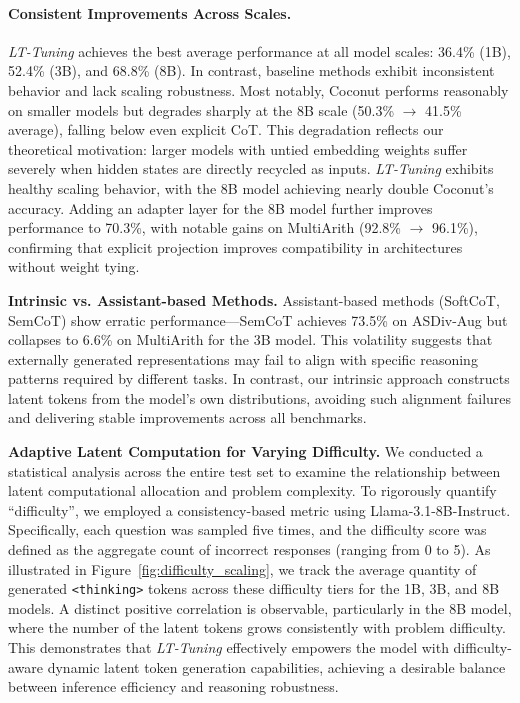 \documentclass{article}
\theoremstyle{plain}
\theoremstyle{definition}
\theoremstyle{remark}
\begin{document}
\paragraph{Consistent Improvements Across Scales.}
\textit{LT-Tuning} achieves the best average performance at all model scales: 36.4\% (1B), 52.4\% (3B), and 68.8\% (8B). In contrast, baseline methods exhibit inconsistent behavior and lack scaling robustness. Most notably, Coconut performs reasonably on smaller models but degrades sharply at the 8B scale (50.3\% $\rightarrow$ 41.5\% average), falling below even explicit CoT. This degradation reflects our theoretical motivation: larger models with untied embedding weights suffer severely when hidden states are directly recycled as inputs. \textit{LT-Tuning} exhibits healthy scaling behavior, with the 8B model achieving nearly double Coconut's accuracy. Adding an adapter layer for the 8B model further improves performance to 70.3\%, with notable gains on MultiArith (92.8\% $\rightarrow$ 96.1\%), confirming that explicit projection improves compatibility in architectures without weight tying.



\textbf{Intrinsic vs. Assistant-based Methods.}
Assistant-based methods (SoftCoT, SemCoT) show erratic performance—SemCoT achieves 73.5\% on ASDiv-Aug but collapses to 6.6\% on MultiArith for the 3B model. This volatility suggests that externally generated representations may fail to align with specific reasoning patterns required by different tasks. 
In contrast, our intrinsic approach constructs latent tokens from the model's own distributions, avoiding such alignment failures and delivering stable improvements across all benchmarks.

\textbf{Adaptive Latent Computation for Varying Difficulty.} We conducted a statistical analysis across the entire test set to examine the relationship between latent computational allocation and problem complexity. To rigorously quantify ``difficulty'', we employed a consistency-based metric using Llama-3.1-8B-Instruct. Specifically, each question was sampled five times, and the difficulty score was defined as the aggregate count of incorrect responses (ranging from 0 to 5). As illustrated in Figure~\ref{fig:difficulty_scaling}, we track the average quantity of generated \texttt{<thinking>} tokens across these difficulty tiers for the 1B, 3B, and 8B models. A distinct positive correlation is observable, particularly in the 8B model, where the number of the latent tokens grows consistently with problem difficulty. This demonstrates that \textit{LT-Tuning} effectively empowers the model with difficulty-aware dynamic latent token generation capabilities, achieving a desirable balance between inference efficiency and reasoning robustness.
\end{document}
